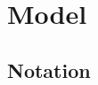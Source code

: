 \documentclass[twoside, a4paper]{article}
\begin{document}

\section{Model}

\subsection{Notation}
\end{document}
